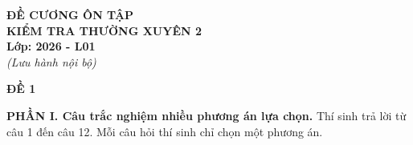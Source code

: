 \documentclass[12pt]{article}
\begin{document}
	
	\begin{titlepage}
		\centering
		\vspace*{4cm}
		
		{\Huge \textbf{ĐỀ CƯƠNG ÔN TẬP}}\\[1cm]
		{\LARGE \textbf{KIỂM TRA THƯỜNG XUYÊN 2}}\\[1.5cm]
		
		{\Large \textbf{Lớp: 2026 - L01}}\\[0.5cm]
		
		{\large \textit{(Lưu hành nội bộ)}}
		
		\vfill
	\end{titlepage}
	
	\newpage
	\begin{center}
		{\LARGE \textbf{ĐỀ 1}}\\[4pt]
	\end{center}
	\vspace{4mm}
	
	\noindent\textbf{PHẦN I. Câu trắc nghiệm nhiều phương án lựa chọn.} Thí sinh trả lời từ câu 1 đến câu 12. Mỗi câu hỏi thí sinh chỉ chọn một phương án.
	\vspace{2mm}
	
\end{document}
